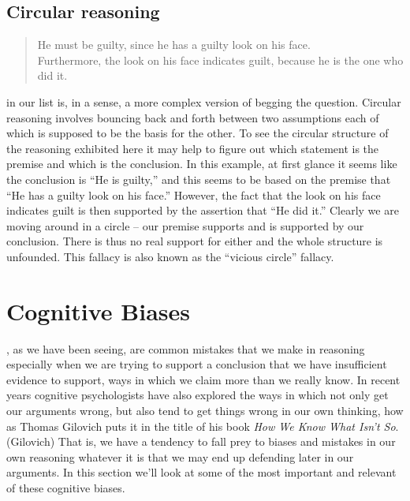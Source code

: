 \documentclass[justified]{tufte-book}
\newenvironment{argument}{\begin{quote}\normalsize}{\end{quote}}
\begin{document}
\hypertarget{circular-reasoning}{%
\subsection*{Circular reasoning}\label{circular-reasoning}}

\begin{argument}
He must be guilty, since he has a guilty look on his face.\\
Furthermore, the look on his face indicates guilt, because he is the one
who did it.
\end{argument}

 in our list is, in a sense, a more complex version of begging the question. Circular reasoning involves bouncing back and forth between two assumptions each of which is supposed to be the basis for the other. To see the circular structure of the reasoning exhibited here it may help to figure out which statement is the premise and which is the conclusion. In this example, at first glance it seems like the conclusion is ``He is guilty,'' and this seems to be based on the premise that ``He has a guilty look on his face.'' However, the fact that the look on his face indicates guilt is then supported by the assertion that ``He did it.'' Clearly we are moving around in a circle -- our premise supports and is supported by our conclusion. There is thus no real support for either and the whole structure is unfounded. This fallacy is also known as the ``vicious circle'' fallacy.

\hypertarget{cognitive-biases}{%
\section{Cognitive Biases}\label{cognitive-biases}}

, as we have been seeing, are common mistakes that we make in reasoning especially when we are trying to support a conclusion that we have insufficient evidence to support, ways in which we claim more than we really know. In recent years cognitive psychologists have also explored the ways in which not only get our arguments wrong, but also tend to get things wrong in our own thinking, how as Thomas Gilovich puts it in the title of his book \emph{How We Know What Isn't So}.(Gilovich) That is, we have a tendency to fall prey to biases and mistakes in our own reasoning whatever it is that we may end up defending later in our arguments. In this section we'll look at some of the most important and relevant of these cognitive biases.
\end{document}
